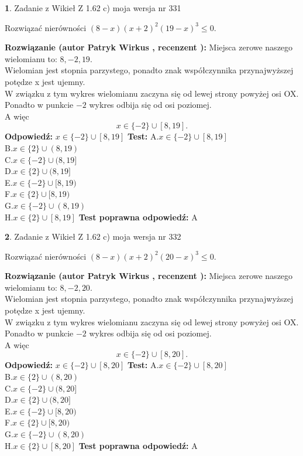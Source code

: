 \documentclass[12pt, a4paper]{article}
\theoremstyle{definition} %
\newtheorem{zad}{}
\newcommand{\zadStart}[1]{\begin{zad}#1\newline}
\newcommand{\zadStop}{\end{zad}}
\newcommand{\rozwStart}[2]{\noindent \textbf{Rozwiązanie (autor #1 , recenzent #2): }\newline}
\newcommand{\rozwStop}{\newline}
\newcommand{\odpStart}{\noindent \textbf{Odpowiedź:}\newline}
\newcommand{\odpStop}{\newline}
\newcommand{\testStart}{\noindent \textbf{Test:}\newline}
\newcommand{\testStop}{\newline}
\newcommand{\kluczStart}{\noindent \textbf{Test poprawna odpowiedź:}\newline}
\newcommand{\kluczStop}{\newline}
\begin{document}
\zadStart{Zadanie z Wikieł Z 1.62 c) moja wersja nr 331}

Rozwiązać nierówności $(8-x)(x+2)^{2}(19-x)^{3}\le0$.
\zadStop
\rozwStart{Patryk Wirkus}{}
Miejsca zerowe naszego wielomianu to: $8, -2, 19$.\\
Wielomian jest stopnia parzystego, ponadto znak współczynnika przy\linebreak najwyższej potędze x jest ujemny.\\ W związku z tym wykres wielomianu zaczyna się od lewej strony powyżej osi OX.\\
Ponadto w punkcie $-2$ wykres odbija się od osi poziomej.\\
A więc $$x \in \{-2\} \cup [8,19].$$
\rozwStop
\odpStart
$x \in \{-2\} \cup [8,19]$
\odpStop
\testStart
A.$x \in \{-2\} \cup [8,19]$\\
B.$x \in \{2\} \cup (8,19)$\\
C.$x \in \{-2\} \cup (8,19]$\\
D.$x \in \{2\} \cup (8,19]$\\
E.$x \in \{-2\} \cup [8,19)$\\
F.$x \in \{2\} \cup [8,19)$\\
G.$x \in \{-2\} \cup (8,19)$\\
H.$x \in \{2\} \cup [8,19]$
\testStop
\kluczStart
A
\kluczStop



\zadStart{Zadanie z Wikieł Z 1.62 c) moja wersja nr 332}

Rozwiązać nierówności $(8-x)(x+2)^{2}(20-x)^{3}\le0$.
\zadStop
\rozwStart{Patryk Wirkus}{}
Miejsca zerowe naszego wielomianu to: $8, -2, 20$.\\
Wielomian jest stopnia parzystego, ponadto znak współczynnika przy\linebreak najwyższej potędze x jest ujemny.\\ W związku z tym wykres wielomianu zaczyna się od lewej strony powyżej osi OX.\\
Ponadto w punkcie $-2$ wykres odbija się od osi poziomej.\\
A więc $$x \in \{-2\} \cup [8,20].$$
\rozwStop
\odpStart
$x \in \{-2\} \cup [8,20]$
\odpStop
\testStart
A.$x \in \{-2\} \cup [8,20]$\\
B.$x \in \{2\} \cup (8,20)$\\
C.$x \in \{-2\} \cup (8,20]$\\
D.$x \in \{2\} \cup (8,20]$\\
E.$x \in \{-2\} \cup [8,20)$\\
F.$x \in \{2\} \cup [8,20)$\\
G.$x \in \{-2\} \cup (8,20)$\\
H.$x \in \{2\} \cup [8,20]$
\testStop
\kluczStart
A
\kluczStop
\end{document}
